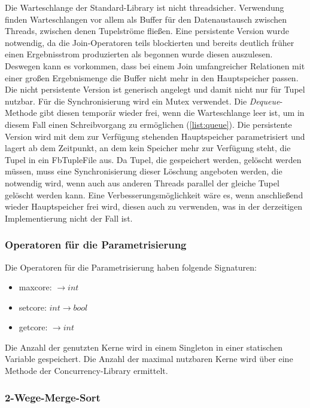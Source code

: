 \documentclass[a4paper,12pt,twoside]{article}
\newcommand{\Fb}[1]{\textit{#1}} %
\begin{document}
Die Warteschlange der Standard-Library ist nicht threadsicher. Verwendung finden Warteschlangen vor allem als Buffer für den Datenaustausch zwischen Threads, zwischen denen Tupelströme fließen. Eine persistente Version wurde notwendig, da die Join-Operatoren teils blockierten und bereits deutlich früher einen Ergebnisstrom produzierten als begonnen wurde diesen auszulesen. Deswegen kann es vorkommen, dass bei einem Join umfangreicher Relationen mit einer großen Ergebnismenge die Buffer nicht mehr in den Hauptspeicher passen. Die nicht persistente Version ist generisch angelegt und damit nicht nur für Tupel nutzbar. Für die Synchronisierung wird ein Mutex verwendet. Die \Fb{Dequeue}-Methode gibt diesen temporär wieder frei, wenn die Warteschlange leer ist, um in diesem Fall einen Schreibvorgang zu ermöglichen (\autoref{list:queue}). Die persistente Version wird mit dem zur Verfügung stehenden Hauptspeicher parametrisiert und lagert ab dem Zeitpunkt, an dem kein Speicher mehr zur Verfügung steht, die Tupel in ein Fb{TupleFile} aus. Da Tupel, die gespeichert werden, gelöscht werden müssen, muss eine Synchronisierung dieser Löschung angeboten werden, die notwendig wird, wenn auch aus anderen Threads parallel der gleiche Tupel gelöscht werden kann. Eine Verbesserungsmöglichkeit wäre es, wenn anschließend wieder Hauptspeicher frei wird, diesen auch zu verwenden, was in der derzeitigen Implementierung nicht der Fall ist.

\subsubsection{Operatoren für die Parametrisierung}

Die Operatoren für die Parametrisierung haben folgende Signaturen:

\begin{itemize}
	\item maxcore: $\longrightarrow int$
	\item setcore: $int \longrightarrow bool$
	\item getcore: $\longrightarrow int$
\end{itemize}

Die Anzahl der genutzten Kerne wird in einem Singleton in einer statischen Variable gespeichert. Die Anzahl der maximal nutzbaren Kerne wird über eine Methode der Concurrency-Library ermittelt.

\subsubsection{2-Wege-Merge-Sort}
\end{document}
